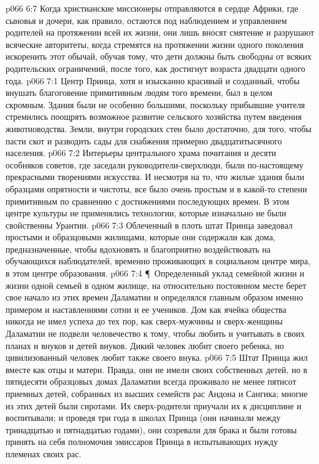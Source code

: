 \vs p066 6:7 Когда христианские миссионеры отправляются в сердце Африки, где сыновья и дочери, как правило, остаются под наблюдением и управлением родителей на протяжении всей их жизни, они лишь вносят смятение и разрушают всяческие авторитеты, когда стремятся на протяжении жизни одного поколения искоренить этот обычай, обучая тому, что дети должны быть свободны от всяких родительских ограничений, после того, как достигнут возраста двадцати одного года.
\vs p066 7:1 Центр Принца, хотя и изысканно красивый и созданный, чтобы внушать благоговение примитивным людям того времени, был в целом скромным. Здания были не особенно большими, поскольку прибывшие учителя стремились поощрять возможное развитие сельского хозяйства путем введения животноводства. Земли, внутри городских стен было достаточно, для того, чтобы пасти скот и разводить сады для снабжения примерно двадцатитысячного населения.
\vs p066 7:2 Интерьеры центрального храма почитания и десяти особняков советов, где заседали руководители\hyp{}сверхлюди, были по\hyp{}настоящему прекрасными творениями искусства. И несмотря на то, что жилые здания были образцами опрятности и чистоты, все было очень простым и в какой\hyp{}то степени примитивным по сравнению с достижениями последующих времен. В этом центре культуры не применялись технологии, которые изначально не были свойственны Урантии.
\vs p066 7:3 Облеченный в плоть штат Принца заведовал простыми и образцовыми жилищами, которые они содержали как дома, предназначенные, чтобы вдохновять и благоприятно воздействовать на обучающихся наблюдателей, временно проживающих в социальном центре мира, в этом центре образования.
\vs p066 7:4 \P\ Определенный уклад семейной жизни и жизни одной семьей в одном жилище, на относительно постоянном месте берет свое начало из этих времен Даламатии и определялся главным образом именно примером и наставлениями сотни и ее учеников. Дом как ячейка общества никогда не имел успеха до тех пор, как сверх\hyp{}мужчины и сверх\hyp{}женщины Даламатии не подвели человечество к тому, чтобы любить и учитывать в своих планах и внуков и детей внуков. Дикий человек любит своего ребенка, но цивилизованный человек любит также своего внука.
\vs p066 7:5 Штат Принца жил вместе как отцы и матери. Правда, они не имели своих собственных детей, но в пятидесяти образцовых домах Даламатии всегда проживало не менее пятисот приемных детей, собранных из высших семейств рас Андона и Сангика; многие из этих детей были сиротами. Их сверх\hyp{}родители приучали их к дисциплине и воспитывали; и проведя три года в школах Принца (они начинали между тринадцатью и пятнадцатью годами), они созревали для брака и были готовы принять на себя полномочия эмиссаров Принца в испытывающих нужду племенах своих рас.
